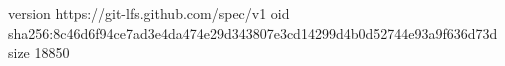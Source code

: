 version https://git-lfs.github.com/spec/v1
oid sha256:8c46d6f94ce7ad3e4da474e29d343807e3cd14299d4b0d52744e93a9f636d73d
size 18850
